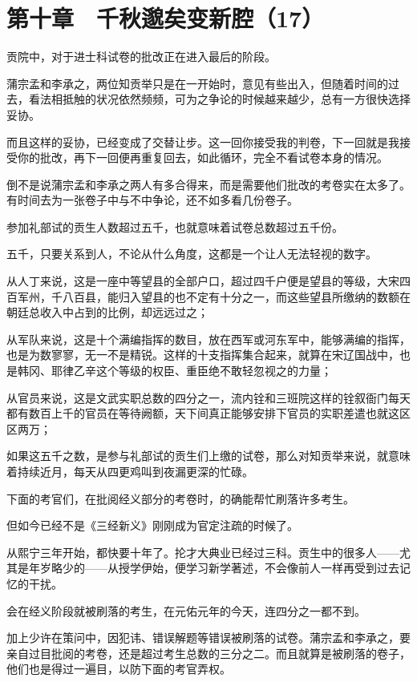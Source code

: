 \section{第十章　千秋邈矣变新腔（17）}

贡院中，对于进士科试卷的批改正在进入最后的阶段。

蒲宗孟和李承之，两位知贡举只是在一开始时，意见有些出入，但随着时间的过去，看法相抵触的状况依然频频，可为之争论的时候越来越少，总有一方很快选择妥协。

而且这样的妥协，已经变成了交替让步。这一回你接受我的判卷，下一回就是我接受你的批改，再下一回便再重复回去，如此循环，完全不看试卷本身的情况。

倒不是说蒲宗孟和李承之两人有多合得来，而是需要他们批改的考卷实在太多了。有时间去为一张卷子中与不中争论，还不如多看几份卷子。

参加礼部试的贡生人数超过五千，也就意味着试卷总数超过五千份。

五千，只要关系到人，不论从什么角度，这都是一个让人无法轻视的数字。

从人丁来说，这是一座中等望县的全部户口，超过四千户便是望县的等级，大宋四百军州，千八百县，能归入望县的也不定有十分之一，而这些望县所缴纳的数额在朝廷总收入中占到的比例，却远远过之；

从军队来说，这是十个满编指挥的数目，放在西军或河东军中，能够满编的指挥，也是为数寥寥，无一不是精锐。这样的十支指挥集合起来，就算在宋辽国战中，也是韩冈、耶律乙辛这个等级的权臣、重臣绝不敢轻忽视之的力量；

从官员来说，这是文武实职总数的四分之一，流内铨和三班院这样的铨叙衙门每天都有数百上千的官员在等待阙额，天下间真正能够安排下官员的实职差遣也就这区区两万；

如果这五千之数，是参与礼部试的贡生们上缴的试卷，那么对知贡举来说，就意味着持续近月，每天从四更鸡叫到夜漏更深的忙碌。

下面的考官们，在批阅经义部分的考卷时，的确能帮忙刷落许多考生。

但如今已经不是《三经新义》刚刚成为官定注疏的时候了。

从熙宁三年开始，都快要十年了。抡才大典业已经过三科。贡生中的很多人——尤其是年岁略少的——从授学伊始，便学习新学著述，不会像前人一样再受到过去记忆的干扰。

会在经义阶段就被刷落的考生，在元佑元年的今天，连四分之一都不到。

加上少许在策问中，因犯讳、错误解题等错误被刷落的试卷。蒲宗孟和李承之，要亲自过目批阅的考卷，还是超过考生总数的三分之二。而且就算是被刷落的卷子，他们也是得过一遍目，以防下面的考官弄权。

